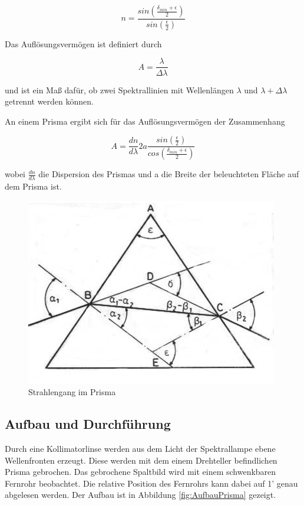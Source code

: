 \documentclass[12pt,a4paper]{article}
\begin{document}
	\begin{equation}
	n = \frac{sin(\frac{\delta_{min}+\epsilon}{2})}{sin(\frac{\epsilon}{2})}
	\end{equation}
	
	Das Auflösungsvermögen ist definiert durch
	
	\begin{equation}
	A = \frac{\lambda}{\Delta \lambda}
	\end{equation} 
	
	und ist ein Maß dafür, ob zwei Spektrallinien mit Wellenlängen $\lambda$ und $\lambda + \Delta \lambda$ getrennt werden können.
	
	An einem Prisma ergibt sich für das Auflösungsvermögen der Zusammenhang
	
	\begin{equation}
	A = \frac{dn}{d\lambda} 2a \frac{sin(\frac{\epsilon}{2})}{cos(\frac{\delta_{min}+\epsilon}{2})}
	\end{equation}
	
	wobei $\frac{dn}{d\lambda}$ die Dispersion des Prismas und a die Breite der beleuchteten Fläche auf dem Prisma ist.

\begin{figure}
\includegraphics[scale=1.0]{Bilder/prisma}
\caption{Strahlengang im Prisma}
\label{fig:Prisma}
\end{figure}

	
	
	\subsection{Aufbau und Durchführung}
	Durch eine Kollimatorlinse werden aus dem Licht der Spektrallampe ebene Wellenfronten erzeugt. Diese werden mit dem einem Drehteller befindlichen Prisma gebrochen. Das gebrochene Spaltbild wird mit einem schwenkbaren Fernrohr beobachtet. Die relative Position des Fernrohrs kann dabei auf 1' genau abgelesen werden.
	Der Aufbau ist in Abbildung \ref{fig:AufbauPrisma} gezeigt.
	
\end{document}
